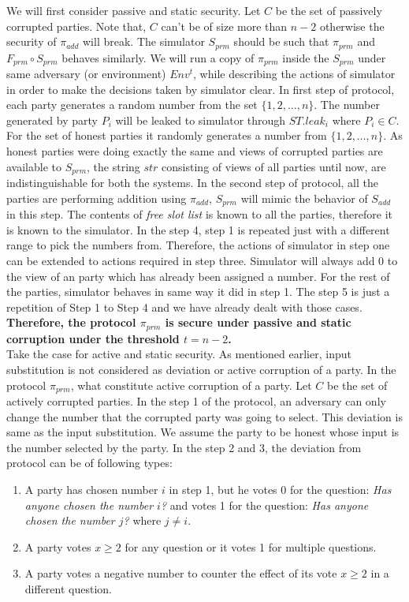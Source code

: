 \documentclass{llncs}
\begin{document}
We will first consider passive and static security. Let $C$ be the set of passively corrupted parties. Note that, $C$ can't be of size more than $n-2$ otherwise the security of $\pi_{add}$ will break. The simulator $S_{prm}$ should be such that $ \pi_{prm} $ and $ F_{prm} \circ S_{prm} $ behaves similarly. We will run a copy of $ \pi_{prm} $ inside the $S_{prm}$ under same adversary (or environment) $Env^t$, while describing the actions of simulator in order to make the decisions taken by simulator clear. In first step of protocol, each party generates a random number from the set $\{1,2,\dots,n\}$. The number generated by party $P_i$ will be leaked to simulator through $ST.leak_i$ where $P_i\in C$. For the set of honest parties it randomly generates a number from $\{1,2,\dots,n\}$. As honest parties were doing exactly the same and views of corrupted parties are available to $S_{prm}$, the string $str$ consisting of views of all parties until now, are indistinguishable for both the systems. In the second step of protocol, all the parties are performing addition using $\pi_{add}$, $S_{prm}$ will mimic the behavior of $S_{add}$ in this step. The contents of \emph{free slot list} is known to all the parties, therefore it is known to the simulator. In the step 4, step 1 is repeated just with a different range to pick the numbers from. Therefore, the actions of simulator in step one can be extended to actions required in step three. Simulator will always add 0 to the view of an party which has already been assigned a number. For the rest of the parties, simulator behaves in same way it did in step 1. The step 5 is just a repetition of Step 1 to Step 4 and we have already dealt with those cases. \textbf{Therefore, the protocol $\pi_{prm}$ is secure under passive and static corruption under the threshold $t=n-2$.}\\
Take the case for active and static security. As mentioned earlier, input substitution is not considered as deviation or active corruption of a party. In the protocol $\pi_{prm}$, what constitute active corruption of a party. Let $C$ be the set of actively corrupted parties. In the step 1 of the protocol, an adversary can only change the number that the corrupted party was going to select. This deviation is same as the input substitution. We assume the party to be honest whose input is the number selected by the party. In the step 2 and 3, the deviation from protocol can be of following types:
\begin{enumerate}
\item A party has chosen number $i$ in step 1, but he votes 0 for the question: \textit{Has anyone chosen the number $i$?} and votes 1 for the question: \textit{Has anyone chosen the number $j$?} where $j\neq i$.
\item A party votes $x\geq 2$ for any question or it votes 1 for multiple questions.
\item A party votes a negative number to counter the effect of its vote $x\geq 2$ in a different question.
\end{enumerate}
\end{document}
